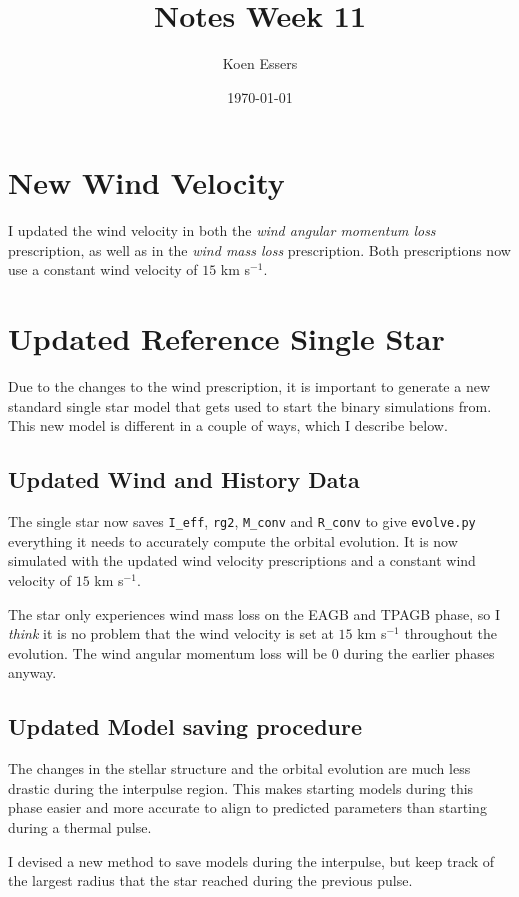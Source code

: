 \documentclass[a4paper,10pt]{article}
\title{Notes Week 11}
\author{Koen Essers}
\date{\today}
\begin{document}
\setuplayout
\section{New Wind Velocity}
I updated the wind velocity in both the \emph{wind angular momentum loss} prescription, as well as in the \emph{wind mass loss} prescription. Both prescriptions now use a constant wind velocity of \(15\) km s\(^{-1}\).
\section{Updated Reference Single Star}
Due to the changes to the wind prescription, it is important to generate a new standard single star model that gets used to start the binary simulations from. This new model is different in a couple of ways, which I describe below.
\subsection{Updated Wind and History Data}
The single star now saves \lstinline[style=output, breaklines=true]|I_eff|, \lstinline[style=output, breaklines=true]|rg2|, \lstinline[style=output, breaklines=true]|M_conv| and \lstinline[style=output, breaklines=true]|R_conv| to give \lstinline[style=output, breaklines=true]|evolve.py| everything it needs to accurately compute the orbital evolution. It is now simulated with the updated wind velocity prescriptions and a constant wind velocity of \(15\) km s\(^{-1}\).

The star only experiences wind mass loss on the EAGB and TPAGB phase, so I \emph{think} it is no problem that the wind velocity is set at \(15\) km s\(^{-1}\) throughout the evolution. The wind angular momentum loss will be \(0\) during the earlier phases anyway.

\subsection{Updated Model saving procedure}
The changes in the stellar structure and the orbital evolution are much less drastic during the interpulse region. This makes starting models during this phase easier and more accurate to align to predicted parameters than starting during a thermal pulse.

I devised a new method to save models during the interpulse, but keep track of the largest radius that the star reached during the previous pulse.
\end{document}
